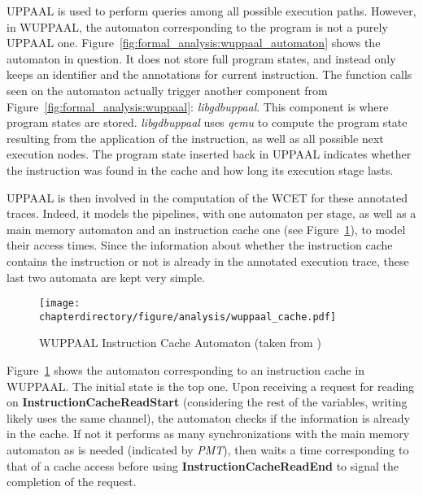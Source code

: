 UPPAAL is used to perform queries among all possible execution paths. However,
in WUPPAAL, the automaton corresponding to the program is not a purely UPPAAL
one. Figure~\ref{fig:formal_analysis:wuppaal_automaton} shows the automaton in
question.  It does not store full program states, and instead only keeps an
identifier and the annotations for current instruction. The function calls seen
on the automaton actually trigger another component from
Figure~\ref{fig:formal_analysis:wuppaal}: \textit{libgdbuppaal}. This component
is where program states are stored. \textit{libgdbuppaal} uses \textit{qemu} to
compute the program state resulting from the application of the instruction, as
well as all possible next execution nodes. The program state inserted back in
UPPAAL indicates whether the instruction was found in the cache and how long its
execution stage lasts.

UPPAAL is then involved in the computation of the WCET for these annotated
traces. Indeed, it models the pipelines, with one automaton per stage, as well
as a main memory automaton and an instruction cache one (see
Figure~\ref{fig:formal_analysis:wuppaal_cache}), to model their access times.
Since the information about whether the instruction cache contains the
instruction or not is already in the annotated execution trace, these last two
automata are kept very simple.

\begin{figure}[hbt]
\begin{center}
\centering
\texttt{[image: \\chapterdirectory/figure/analysis/wuppaal\_cache.pdf]}
\end{center}
\caption{WUPPAAL Instruction Cache Automaton (taken from
\cite{wuppaal})}%
\label{fig:formal_analysis:wuppaal_cache}
\end{figure}

Figure~\ref{fig:formal_analysis:wuppaal_cache} shows the automaton
corresponding to an instruction cache in WUPPAAL. The initial state is the top
one. Upon receiving a request for reading on \textbf{InstructionCacheReadStart}
(considering the rest of the variables, writing likely uses the same channel),
the automaton checks if the information is already in the cache. If not it
performs as many synchronizations with the main memory automaton as is needed
(indicated by \textit{PMT}), then waits a time corresponding to that of a
cache access before using \textbf{InstructionCacheReadEnd} to signal the
completion of the request.

\stopallthesefloats
